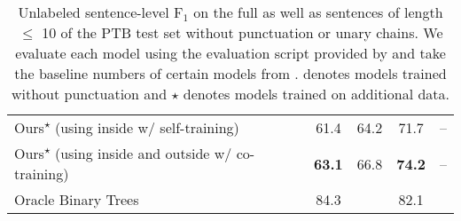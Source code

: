 \documentclass[11pt]{article}
\begin{document}
\begin{table}[t]
{\begin{tabular}{lcccc}
    \multicolumn{1}{l}{Ours\textsuperscript{$\star$} (using inside w/ self-training)} & \cellcolor{pearDark!20}61.4 & \cellcolor{pearDark!20}64.2 & \cellcolor{pearDark!20}71.7 & --\\
    \multicolumn{1}{l}{Ours\textsuperscript{$\star$} (using inside and outside w/ co-training)} & \cellcolor{pearDark!20}\textbf{63.1} & \cellcolor{pearDark!20}66.8 & \cellcolor{pearDark!20}\textbf{74.2} & --\\
    \midrule
    \multicolumn{1}{l}{Oracle Binary Trees} & 84.3 & & 82.1 & \\
    \bottomrule
    \end{tabular}
    }
    \caption[Results on the PTB test set]{Unlabeled sentence-level F$_1$ on the full as well as sentences of length $\leq$ 10 of the PTB test set without punctuation or unary chains. We evaluate each model using the evaluation script provided by \citet{kim-etal-2019-compound} and take the baseline numbers of certain models from \citep{kim-etal-2019-compound, cao-etal-2020-unsupervised}.
    {\textdagger} denotes models trained without punctuation and $\star$ denotes models trained on additional data.}
    \label{tab:ptb-results}
\end{table} \begin{table}[t]
   \centering
\end{table}
\end{document}
